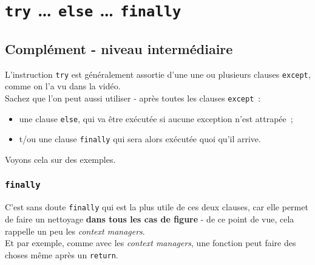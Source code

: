     \hypertarget{try-else-finally}{%
\section{\texorpdfstring{\texttt{try} \ldots{} \texttt{else} \ldots{}
\texttt{finally}}{try \ldots{} else \ldots{} finally}}\label{try-else-finally}}

    \hypertarget{compluxe9ment---niveau-intermuxe9diaire}{%
\subsection{Complément - niveau
intermédiaire}\label{compluxe9ment---niveau-intermuxe9diaire}}

    L'instruction \texttt{try} est généralement assortie d'une une ou
plusieurs clauses \texttt{except}, comme on l'a vu dans la vidéo.\\

Sachez que l'on peut aussi utiliser - après toutes les clauses
\texttt{except}~:

\begin{itemize}
	\item 
	une clause \texttt{else}, qui va être exécutée si
	aucune exception n'est attrapée~;
	\item 
	t/ou une clause \texttt{finally} qui sera alors exécutée quoi qu'il arrive.
\end{itemize}

    Voyons cela sur des exemples.

    \hypertarget{finally}{%
\subsubsection{\texorpdfstring{\texttt{finally}}{finally}}\label{finally}}

    C'est sans doute \texttt{finally} qui est la plus utile de ces deux
clauses, car elle permet de faire un nettoyage \textbf{dans tous les cas
de figure} - de ce point de vue, cela rappelle un peu les \emph{context
managers}.\\

Et par exemple, comme avec les \emph{context managers}, une fonction
peut faire des choses même après un \texttt{return}.

